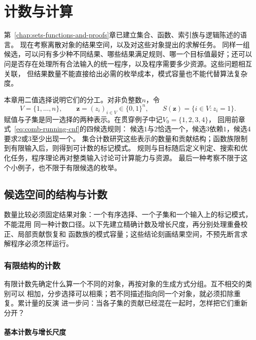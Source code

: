 \chapter{计数与计算}
\label{chap:combinatorics}

第~\ref{chap:sets-functions-and-proofs}章已建立集合、函数、索引族与逻辑陈述的语言。
现在考察离散对象的结果空间，以及对这些对象提出的求解任务。
同样一组候选，可以问有多少种不同结果、哪些结果满足规则、哪一个目标值最好；还可以
问是否存在处理所有合法输入的统一程序，以及程序需要多少资源。这些问题相互关联，
但结果数量不能直接给出必需的枚举成本，模式容量也不能代替算法复杂度。

本章用二值选择说明它们的分工。对非负整数$n$，令
\[
  V=\{1,\ldots,n\},\qquad
  \bm z=(z_i)_{i\in V}\in\{0,1\}^n,\qquad
  S(\bm z)=\{i\in V:z_i=1\}.
\]
赋值与子集是同一选择的两种表示。在贯穿例子中记$V_0=\{1,2,3,4\}$，
回用前章式~\eqref{eq:comb-running-cnf}的四候选规则：
候选$1$与$2$恰选一个，候选$3$依赖$1$，候选$4$要求$2$或$3$至少出现一个。
集合计数研究这些表示的数量和贡献结构；函数族限制到有限输入后，则得到可计数的标记模式。
规则与目标随后定义判定、搜索和优化任务，程序理论再对整类输入讨论可计算能力与资源。
最后一种考察不限于这个小例子，也不限于有限候选的枚举。

\section{候选空间的结构与计数}
\label{sec:comb-families-counting}

数量比较必须固定结果对象：一个有序选择、一个子集和一个输入上的标记模式，不能混用
同一种计数口径。以下先建立精确计数及增长尺度，再分别处理重叠校正、局部贡献恢复和
函数族的模式容量；这些结论刻画结果空间，不预先断言求解程序必须怎样运行。

\subsection{有限结构的计数}
\label{sec:comb-finite-counting}

有限计数先确定什么算一个不同的对象，再按对象的生成方式分组。互不相交的类别可以
相加，分步选择可以相乘；若不同描述指向同一个对象，就必须扣除重复。累计量的反演
进一步问：当各子集的贡献已经混在一起时，怎样把它们重新分开？

\subsubsection{基本计数与增长尺度}
\label{sec:comb-growth-scales}

